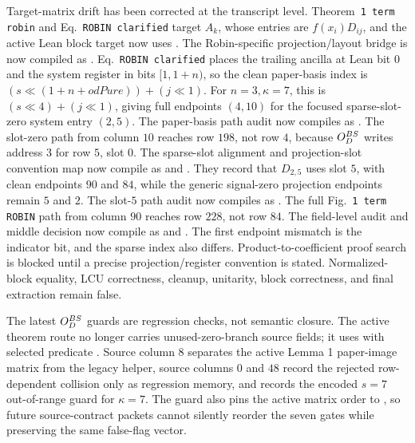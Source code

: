 Target-matrix drift has been corrected at the transcript level.
Theorem~\texttt{1 term robin} and Eq.~\texttt{ROBIN clarified} target
\(A_k\), whose entries are \(f(x_i)D_{ij}\), and the active Lean block target
now uses .  The Robin-specific projection/layout
bridge is now compiled as
.
Eq.~\texttt{ROBIN clarified} places the trailing ancilla at Lean bit \(0\) and
the system register in bits \([1,1+n)\), so the clean paper-basis index is
\((s \ll (1+n+odPure)) + (j \ll 1)\).  For \(n=3,\kappa=7\), this is
\((s \ll 4) + (j \ll 1)\), giving full endpoints \((4,10)\) for the focused
sparse-slot-zero system entry \((2,5)\).  The paper-basis path audit now
compiles as
.
The slot-zero path from column \(10\) reaches row \(198\), not row \(4\),
because \(O_D^{BS}\) writes address \(3\) for row \(5\), slot \(0\).  The
sparse-slot alignment and projection-slot convention map now compile as
and
.
They record that \(D_{2,5}\) uses slot \(5\), with clean endpoints \(90\) and
\(84\), while the generic signal-zero projection endpoints remain \(5\) and
\(2\).  The slot-\(5\) path audit now compiles as
.  The
full Fig.~\texttt{1 term ROBIN} path from column \(90\) reaches row \(228\),
not row \(84\).  The field-level audit and middle decision now compile as
and
.  The first
endpoint mismatch is the indicator bit, and the sparse index also differs.
Product-to-coefficient proof search is blocked until a precise
projection/register convention is stated.  Normalized-block equality, LCU
correctness, cleanup, unitarity, block correctness, and final extraction
remain false.

The latest \(O_D^{BS}\) guards are regression checks, not semantic closure.
The active theorem route no longer carries unused-zero-branch source fields;
it uses  with selected predicate
.  Source column \(8\) separates
the active Lemma 1 paper-image matrix from the legacy helper, source columns
\(0\) and \(48\) record the rejected row-dependent collision only as
regression memory, and
records the encoded \(s=7\) out-of-range guard for \(\kappa=7\).
The guard
 also pins the
active matrix order to , so future source-contract
packets cannot silently reorder the seven gates while preserving the same
false-flag vector.

